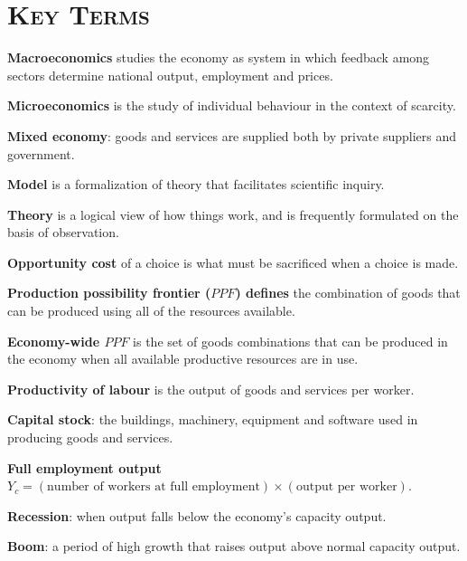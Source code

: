 \newpage
{}
	\section*{\textsc{Key Terms}}
\begin{keyterms}
\textbf{Macroeconomics} studies the economy as system in which feedback among sectors determine national output, employment and prices.

\textbf{Microeconomics} is the study of individual behaviour in the context of scarcity.

\textbf{Mixed economy}: goods and services are supplied both by private suppliers and government.

\textbf{Model} is a formalization of theory that facilitates scientific inquiry.

\textbf{Theory} is a logical view of how things work, and is frequently formulated on the basis of observation.

\textbf{Opportunity cost} of a choice is what must be sacrificed when a choice is made.

\textbf{Production possibility frontier ($PPF$) defines} the combination of goods that can be produced using all of the resources available.

\textbf{Economy-wide $PPF$} is the set of goods combinations that can be produced in the economy when all available productive resources are in use.

\textbf{Productivity of labour} is the output of goods and services per worker.

\textbf{Capital stock}: the buildings, machinery, equipment and software used in producing goods and services.

\textbf{Full employment output} $Y_c=(\text{number of workers at full employment})\times(\text{output per worker})$.

\textbf{Recession}: when output falls below the economy's capacity output.

\textbf{Boom}: a period of high growth that raises output above normal capacity output.
\end{keyterms}